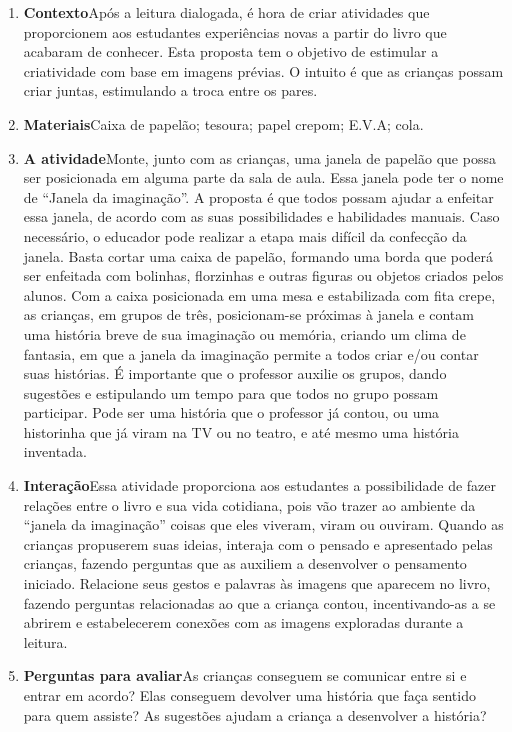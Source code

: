 \documentclass[11pt]{extarticle}
\begin{document}


\begin{enumerate}
\item \textbf{Contexto}\quad Após a leitura dialogada, é hora de criar 
atividades que proporcionem aos estudantes experiências novas a partir do livro
que acabaram de conhecer.
Esta proposta tem o objetivo de estimular a criatividade com base em imagens prévias. O intuito é que as crianças possam criar juntas, estimulando a troca entre os pares.

\item \textbf{Materiais}\quad Caixa de papelão; tesoura; papel crepom; E.V.A; cola.

\item \textbf{A atividade}\quad Monte, junto com as crianças, uma janela de papelão que possa ser posicionada em alguma parte da sala de aula. Essa janela pode ter o nome de “Janela da imaginação”. A proposta é que todos possam ajudar a enfeitar essa janela, de acordo com as suas possibilidades e habilidades manuais. Caso necessário, o educador pode realizar a etapa mais difícil da confecção da janela. Basta cortar uma caixa de papelão, formando uma borda que poderá ser enfeitada com bolinhas, florzinhas e outras figuras ou objetos criados pelos alunos. Com a caixa posicionada em uma mesa e estabilizada com fita crepe, as crianças, em grupos de três, posicionam-se próximas à janela e contam uma história breve de sua imaginação ou memória, criando um clima de fantasia, em que a janela da imaginação permite a todos criar e/ou contar suas histórias. É importante que o professor auxilie os grupos, dando sugestões e estipulando um tempo para que todos no grupo possam participar. Pode ser uma história que o professor já contou, ou uma historinha que já viram na TV ou no teatro, e até mesmo uma história inventada.  

\item \textbf{Interação}\quad Essa atividade proporciona aos estudantes a possibilidade de fazer relações entre o livro e sua vida cotidiana, pois vão trazer ao ambiente da ``janela da imaginação'' coisas que eles viveram, viram ou ouviram. Quando as crianças propuserem suas ideias, interaja com o pensado e apresentado pelas crianças, fazendo perguntas que as auxiliem a desenvolver o pensamento iniciado.
Relacione seus gestos e palavras às imagens que aparecem no livro, fazendo perguntas relacionadas ao que a criança contou, incentivando-as a se abrirem e estabelecerem conexões com as imagens exploradas durante a leitura.

\item \textbf{Perguntas para avaliar}\quad As crianças conseguem se comunicar entre si e entrar em acordo? Elas conseguem devolver uma história que faça sentido para quem assiste? As sugestões ajudam a criança a desenvolver a história?
\end{enumerate}
\end{document}
